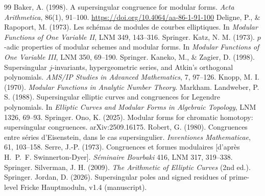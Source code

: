 \documentclass[11pt,a4paper]{article}
\numberwithin{equation}{section}
\theoremstyle{definition}
\theoremstyle{remark}
\begin{document}
\begin{thebibliography}{99}\small
{} Baker, A. (1998). A supersingular congruence for modular forms.
\emph{Acta Arithmetica}, 86(1), 91--100. \url{https://doi.org/10.4064/aa-86-1-91-100}
 Deligne, P., \& Rapoport, M. (1973). Les sch\'emas de modules de courbes
elliptiques. In \emph{Modular Functions of One Variable II}, LNM 349, 143--316. Springer.
 Katz, N. M. (1973). $p$-adic properties of modular schemes and modular forms.
In \emph{Modular Functions of One Variable III}, LNM 350, 69--190. Springer.
 Kaneko, M., \& Zagier, D. (1998). Supersingular $j$-invariants, hypergeometric
series, and Atkin's orthogonal polynomials. \emph{AMS/IP Studies in Advanced Mathematics}, 7, 97--126.
 Knopp, M. I. (1970). \emph{Modular Functions in Analytic Number Theory}.
Markham.
 Landweber, P. S. (1988). Supersingular elliptic curves and congruences for
Legendre polynomials. In \emph{Elliptic Curves and Modular Forms in Algebraic Topology},
LNM 1326, 69--93. Springer.
 Ono, K. (2025). Modular forms for chromatic homotopy: supersingular
congruences. arXiv:2509.16175.
 Robert, G. (1980). Congruences entre s\'eries d'Eisenstein, dans le cas
supersingulier. \emph{Inventiones Mathematicae}, 61, 103--158.
 Serre, J.-P. (1973). Congruences et formes modulaires [d'apr\`es
H.~P.~F. Swinnerton-Dyer]. \emph{S\'eminaire Bourbaki} 416, LNM 317, 319--338. Springer.
 Silverman, J. H. (2009). \emph{The Arithmetic of Elliptic Curves}
(2nd ed.). Springer.
 Jordan, D. (2026). Supersingular poles and signed residues of prime-level
Fricke Hauptmoduln, v1.4 (manuscript).
\end{thebibliography}
\end{document}
